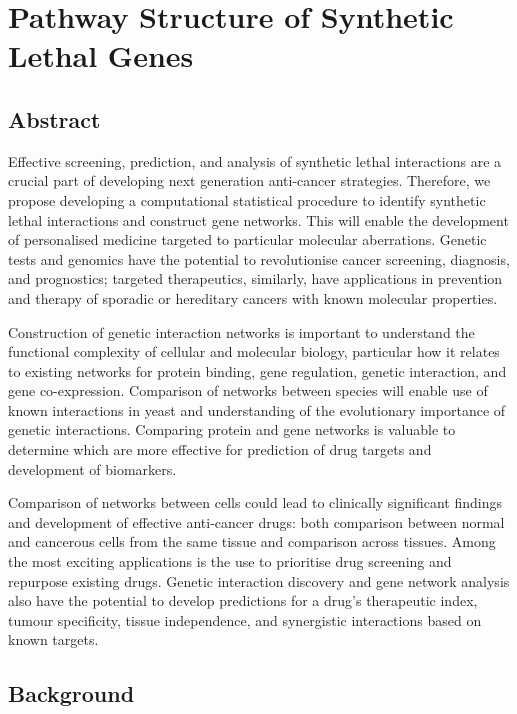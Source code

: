 \chapter{Pathway Structure of Synthetic Lethal Genes}
\label{chap:Pathways}

\section{Abstract}

Effective screening, prediction, and analysis of synthetic lethal interactions are a crucial part of developing next generation anti-cancer strategies. Therefore, we propose developing a computational statistical procedure to identify synthetic lethal interactions and construct gene networks. This will enable the development of personalised medicine targeted to particular molecular aberrations. Genetic tests and genomics have the potential to revolutionise cancer screening, diagnosis, and prognostics; targeted therapeutics, similarly, have applications in prevention and therapy of sporadic or hereditary cancers with known molecular properties.

Construction of genetic interaction networks is important to understand the functional complexity of cellular and molecular biology, particular how it relates to existing networks for protein binding, gene regulation, genetic interaction, and gene co-expression. Comparison of networks between species will enable use of known interactions in yeast and understanding of the evolutionary importance of genetic interactions. Comparing protein and gene networks is valuable to determine which are more effective for prediction of drug targets and development of biomarkers.

Comparison of networks between cells could lead to clinically significant findings and development of effective anti-cancer drugs: both comparison between normal and cancerous cells from the same tissue and comparison across tissues. Among the most exciting applications is the use to prioritise drug screening and repurpose existing drugs. Genetic interaction discovery and gene network analysis also have the potential to develop predictions for a drug's therapeutic index, tumour specificity, tissue independence, and synergistic interactions based on known targets.

\section{Background}


